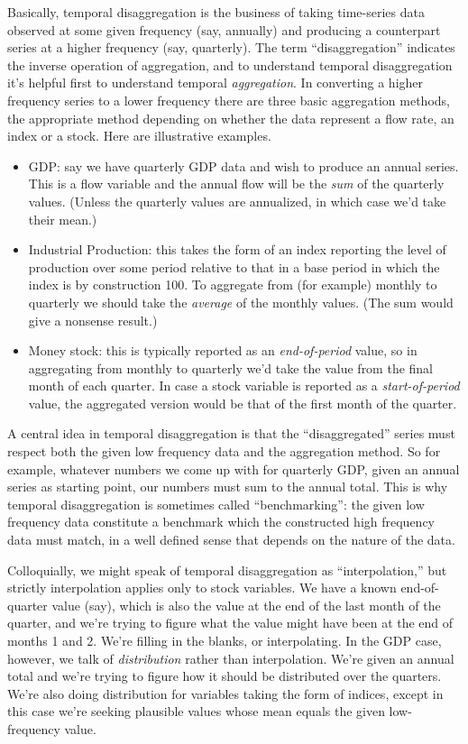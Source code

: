 Basically, temporal disaggregation is the business of taking
time-series data observed at some given frequency (say, annually) and
producing a counterpart series at a higher frequency (say,
quarterly). The term ``disaggregation'' indicates the inverse
operation of aggregation, and to understand temporal disaggregation
it's helpful first to understand temporal \textit{aggregation}. In
converting a higher frequency series to a lower frequency there are
three basic aggregation methods, the appropriate method depending on
whether the data represent a flow rate, an index or a stock. Here are
illustrative examples.
\begin{itemize}
\item GDP: say we have quarterly GDP data and wish to produce an
  annual series. This is a flow variable and the annual flow will be
  the \textit{sum} of the quarterly values. (Unless the quarterly
  values are annualized, in which case we'd take their mean.)
\item Industrial Production: this takes the form of an index reporting
  the level of production over some period relative to that in a base
  period in which the index is by construction 100. To aggregate from
  (for example) monthly to quarterly we should take the
  \textit{average} of the monthly values. (The sum would give a
  nonsense result.)
\item Money stock: this is typically reported as an
  \textit{end-of-period} value, so in aggregating from monthly to
  quarterly we'd take the value from the final month of each
  quarter. In case a stock variable is reported as a
  \textit{start-of-period} value, the aggregated version would be that
  of the first month of the quarter.
\end{itemize}

A central idea in temporal disaggregation is that the
``disaggregated'' series must respect both the given low frequency
data and the aggregation method. So for example, whatever numbers we
come up with for quarterly GDP, given an annual series as starting
point, our numbers must sum to the annual total. This is why temporal
disaggregation is sometimes called ``benchmarking'': the given low
frequency data constitute a benchmark which the constructed high
frequency data must match, in a well defined sense that depends on the
nature of the data.

Colloquially, we might speak of temporal disaggregation as
``interpolation,'' but strictly interpolation applies only to stock
variables. We have a known end-of-quarter value (say), which is also
the value at the end of the last month of the quarter, and we're
trying to figure what the value might have been at the end of months 1
and 2. We're filling in the blanks, or interpolating. In the GDP case,
however, we talk of \textit{distribution} rather than
interpolation. We're given an annual total and we're trying to figure
how it should be distributed over the quarters. We're also doing
distribution for variables taking the form of indices, except in this
case we're seeking plausible values whose mean equals the given
low-frequency value.

